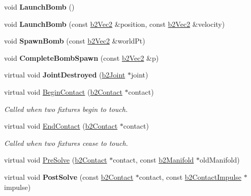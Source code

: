 \begin{DoxyCompactItemize}
\item 
\hypertarget{class_test_a3f004c3be556e7765e39c59ba1561441}{void {\bfseries Launch\-Bomb} ()}\label{class_test_a3f004c3be556e7765e39c59ba1561441}

\item 
\hypertarget{class_test_a433791c82ebf92a7e9c1b35463158008}{void {\bfseries Launch\-Bomb} (const \hyperlink{structb2_vec2}{b2\-Vec2} \&position, const \hyperlink{structb2_vec2}{b2\-Vec2} \&velocity)}\label{class_test_a433791c82ebf92a7e9c1b35463158008}

\item 
\hypertarget{class_test_a3c7ac01710bbc0371aa0513b970cb4a4}{void {\bfseries Spawn\-Bomb} (const \hyperlink{structb2_vec2}{b2\-Vec2} \&world\-Pt)}\label{class_test_a3c7ac01710bbc0371aa0513b970cb4a4}

\item 
\hypertarget{class_test_a5f79351b4f312e7ecbdbfd92e76fc806}{void {\bfseries Complete\-Bomb\-Spawn} (const \hyperlink{structb2_vec2}{b2\-Vec2} \&p)}\label{class_test_a5f79351b4f312e7ecbdbfd92e76fc806}

\item 
\hypertarget{class_test_a27badb0e44400afbbbb101e58ac7bf4f}{virtual void {\bfseries Joint\-Destroyed} (\hyperlink{classb2_joint}{b2\-Joint} $\ast$joint)}\label{class_test_a27badb0e44400afbbbb101e58ac7bf4f}

\item 
\hypertarget{class_test_ade381c3186c925cdf5dc30b0153411ba}{virtual void \hyperlink{class_test_ade381c3186c925cdf5dc30b0153411ba}{Begin\-Contact} (\hyperlink{classb2_contact}{b2\-Contact} $\ast$contact)}\label{class_test_ade381c3186c925cdf5dc30b0153411ba}

\begin{DoxyCompactList}\small\item\em Called when two fixtures begin to touch. \end{DoxyCompactList}\item 
\hypertarget{class_test_a07844a975adb8d27f9523db4addd9813}{virtual void \hyperlink{class_test_a07844a975adb8d27f9523db4addd9813}{End\-Contact} (\hyperlink{classb2_contact}{b2\-Contact} $\ast$contact)}\label{class_test_a07844a975adb8d27f9523db4addd9813}

\begin{DoxyCompactList}\small\item\em Called when two fixtures cease to touch. \end{DoxyCompactList}\item 
virtual void \hyperlink{class_test_ab815ed5d709ccbcbe567838e01fe30c4}{Pre\-Solve} (\hyperlink{classb2_contact}{b2\-Contact} $\ast$contact, const \hyperlink{structb2_manifold}{b2\-Manifold} $\ast$old\-Manifold)
\item 
\hypertarget{class_test_a73c8522bad357c7762893109ca28e20a}{virtual void {\bfseries Post\-Solve} (const \hyperlink{classb2_contact}{b2\-Contact} $\ast$contact, const \hyperlink{structb2_contact_impulse}{b2\-Contact\-Impulse} $\ast$impulse)}\label{class_test_a73c8522bad357c7762893109ca28e20a}


\end{DoxyCompactItemize}
